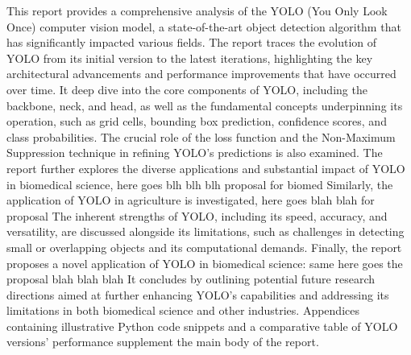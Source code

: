 This report provides a comprehensive analysis of the YOLO (You Only Look Once) computer vision model, a state-of-the-art object detection algorithm that has significantly impacted various fields. The report traces the evolution of YOLO from its initial version to the latest iterations, highlighting the key architectural advancements and performance improvements that have occurred over time. It deep dive into the core components of YOLO, including the backbone, neck, and head, as well as the fundamental concepts underpinning its operation, such as grid cells, bounding box prediction, confidence scores, and class probabilities. The crucial role of the loss function and the Non-Maximum Suppression technique in refining YOLO's predictions is also examined.
The report further explores the diverse applications and substantial impact of YOLO in biomedical science, here goes blh blh blh proposal for biomed Similarly, the application of YOLO in agriculture is investigated, here goes blah blah for proposal 
The inherent strengths of YOLO, including its speed, accuracy, and versatility, are discussed alongside its limitations, such as challenges in detecting small or overlapping objects and its computational demands. Finally, the report proposes a novel application of YOLO in biomedical science: same here goes the proposal blah blah blah It concludes by outlining potential future research directions aimed at further enhancing YOLO's capabilities and addressing its limitations in both biomedical science and other industries. Appendices containing illustrative Python code snippets and a comparative table of YOLO versions' performance supplement the main body of the report.
